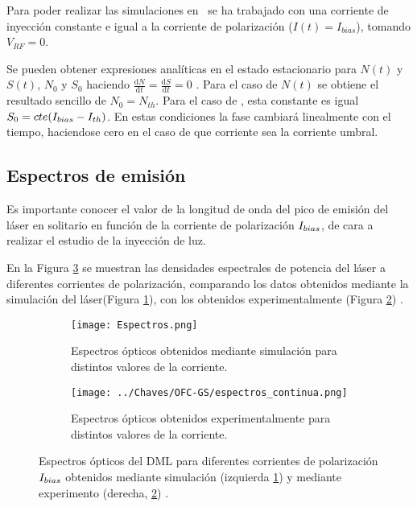 
Para poder realizar las simulaciones en \cw\ se ha trabajado con una corriente de inyección constante e igual a la corriente de polarización ($I(t) = I_{bias}$), tomando $V_{RF} = 0$.

Se pueden obtener expresiones anal\'iticas en el estado estacionario para $N(t)$ y $S(t)$, $N_0$ y $S_0$ haciendo $\frac{\mathrm{d} N}{\mathrm{d} t} = \frac{\mathrm{d} S}{\mathrm{d} t} = 0$ \cite{van1995semiconductor}. Para el caso de $N(t)$ se obtiene el resultado sencillo de $N_0 = N_{th}$. Para el caso de \s, esta constante es igual $S_0 = cte (I_{bias}- I_{th})$. En estas condiciones la fase cambiará linealmente con el tiempo, haciendose cero en el caso de que corriente sea la corriente umbral.

\subsection{Espectros de emisión}
	\label{Sol:CW:Spectr}

	Es importante conocer el valor de la longitud de onda del pico de emisión del láser en solitario en función de la corriente de polarización $I_{bias}$, de cara a realizar el estudio de la inyección de luz.

	En la Figura \ref{Img:spectrosCW} se muestran las densidades espectrales de potencia del láser a diferentes corrientes de polarización, comparando los datos obtenidos mediante la simulación del láser(Figura \ref{Img:spectrosCW:sim}), con los obtenidos experimentalmente (Figura \ref{Img:spectrosCW:exp}) \cite{Chaves19}.

		\begin{figure}[H]
			\centering
			\begin{subfigure}{0.45\textwidth}
				\centering
				\texttt{[image: Espectros.png]}
				\caption{\label{Img:spectrosCW:sim}Espectros ópticos obtenidos mediante simulación para distintos valores de la corriente.}
			\end{subfigure}
			\begin{subfigure}{0.45\textwidth}
				\centering
				\texttt{[image: ../Chaves/OFC-GS/espectros\_continua.png]}
				\caption{\label{Img:spectrosCW:exp}Espectros ópticos obtenidos experimentalmente para distintos valores de la corriente.}	
			\end{subfigure}
			\caption{\label{Img:spectrosCW}Espectros ópticos del DML para diferentes corrientes de polarización $I_{bias}$ obtenidos mediante simulación (izquierda \ref{Img:spectrosCW:sim}) y mediante experimento (derecha, \ref{Img:spectrosCW:exp}) \cite{Chaves19}.}
		\end{figure}

